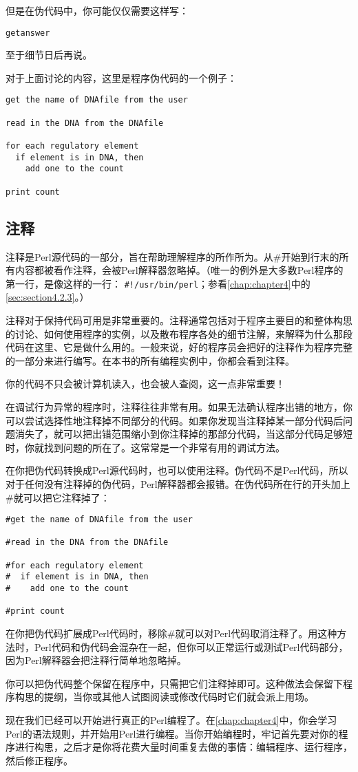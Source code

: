 但是在伪代码中，你可能仅仅需要这样写：

\begin{lstlisting}
getanswer
\end{lstlisting}

至于细节日后再说。

对于上面讨论的内容，这里是程序伪代码的一个例子：

\begin{lstlisting}
get the name of DNAfile from the user

read in the DNA from the DNAfile

for each regulatory element
  if element is in DNA, then
    add one to the count

print count
\end{lstlisting}

\subsection{注释}
注释是Perl源代码的一部分，旨在帮助理解程序的所作所为。从\#开始到行末的所有内容都被看作注释，会被Perl解释器忽略掉。（唯一的例外是大多数Perl程序的第一行，是像这样的一行： \verb|#!/usr/bin/perl|；参看\autoref{chap:chapter4}中的\autoref{sec:section4.2.3}。）

注释对于保持代码可用是非常重要的。注释通常包括对于程序主要目的和整体构思的讨论、如何使用程序的实例，以及散布程序各处的细节注解，来解释为什么那段代码在这里、它是做什么用的。一般来说，好的程序员会把好的注释作为程序完整的一部分来进行编写。在本书的所有编程实例中，你都会看到注释。

你的代码不只会被计算机读入，也会被人查阅，这一点非常重要！

在调试行为异常的程序时，注释往往非常有用。如果无法确认程序出错的地方，你可以尝试选择性地注释掉不同部分的代码。如果你发现当注释掉某一部分代码后问题消失了，就可以把出错范围缩小到你注释掉的那部分代码，当这部分代码足够短时，你就找到问题的所在了。这常常是一个非常有用的调试方法。

在你把伪代码转换成Perl源代码时，也可以使用注释。伪代码不是Perl代码，所以对于任何没有注释掉的伪代码，Perl解释器都会报错。在伪代码所在行的开头加上\#就可以把它注释掉了：

\begin{lstlisting}
#get the name of DNAfile from the user

#read in the DNA from the DNAfile

#for each regulatory element
#  if element is in DNA, then
#    add one to the count

#print count
\end{lstlisting}

在你把伪代码扩展成Perl代码时，移除\#就可以对Perl代码取消注释了。用这种方法时，Perl代码和伪代码会混杂在一起，但你可以正常运行或测试Perl代码部分，因为Perl解释器会把注释行简单地忽略掉。

你可以把伪代码整个保留在程序中，只需把它们注释掉即可。这种做法会保留下程序构思的提纲，当你或其他人试图阅读或修改代码时它们就会派上用场。

现在我们已经可以开始进行真正的Perl编程了。在\autoref{chap:chapter4}中，你会学习Perl的语法规则，并开始用Perl进行编程。当你开始编程时，牢记首先要对你的程序进行构思，之后才是你将花费大量时间重复去做的事情：编辑程序、运行程序，然后修正程序。
